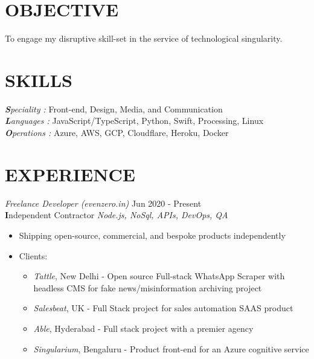 \documentclass[margin, 10pt]{res} %
\begin{document}
\begin{resume}

\section{\ttfamily OBJECTIVE}  
To engage my disruptive skill-set in the service of technological singularity.

\section{\ttfamily \color{Black} SKILLS} 

{\sl\textbf Speciality :} Front-end, Design, Media, and Communication \\
{\sl\textbf Languages :} JavaScript/TypeScript, Python, Swift, Processing, Linux\\
{\sl\textbf Operations :} Azure, AWS, GCP, Cloudflare, Heroku, Docker


\section{\ttfamily EXPERIENCE}

{\sl Freelance Developer (evenzero.in)} \hfill Jun 2020 - \color{RubineRed} Present\color{Black}\\
\textbf Independent Contractor \hfill {\scriptsize \it Node.js, NoSql, APIs, DevOps, QA}
\begin{itemize}
\item Shipping open-source, commercial, and bespoke products independently
\item Clients:
\begin{itemize}
\item {\sl Tattle}, New Delhi - Open source Full-stack WhatsApp Scraper with headless CMS for fake news/misinformation archiving project
\item {\sl Salesbeat}, UK - Full Stack project for sales automation SAAS product
\item {\sl Able}, Hyderabad - Full stack project with a premier agency
\item {\sl Singularium}, Bengaluru - Product front-end for an Azure cognitive service
\end{itemize}
\end{itemize}


\end{resume}
\end{document}
